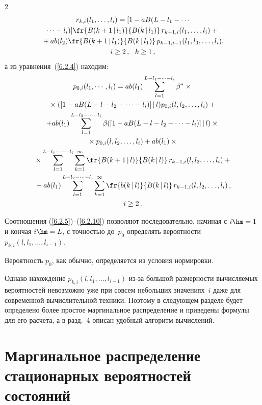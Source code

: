 \begin{multicols}{2}
\noindent
\begin{multline}
r_{k,i}(l_1,\ldots,l_i)
=[1 - a B(L-l_1-\cdots\\
\cdots -l_i)]
\fr{B(k+1\,|\,l_1)}{ B(k\,|\,l_1)}
\,r_{k-1,i}(l_1,\ldots,l_i)
 +{}
\\
{}+
a b(l_2)
\fr{B(k+1\,|\,l_1)}{ B(k\,|\,l_1)}
\,p_{k-1,i-1}(l_1,l_3,\ldots,l_i),
\\
 i \ge 2\,,\ \ k\ge 1\,,
\label{6.2.9}
\end{multline}
а из уравнения~(\ref{6.2.4}) находим:
\begin{multline}
p_{0,i}(l_1,\cdots,l_i)
=a b(l_1)
\sum\limits_{l=1}^{L-l_1-\cdots-l_i}
\beta^*\times{}\\
{}\times([1 - a B(L-l-l_2-\cdots-l_i)]\,|\,l)
p_{0,i}(l,l_2,\ldots,l_i)
 +{}
\\
+a b(l_1)
\sum\limits_{l=1}^{L-l_2-\cdots-l_i}
\beta([1 - a B(L-l-l_2-\cdots-l_i)]\,|\,l)\times{}\\
{}\times
p_{0,i}(l,l_2,\ldots,l_i)
 +a b(l_1)\times{}
\\
{}\times
\sum\limits_{l=1}^{L-l_1-\cdots-l_i}
\sum\limits_{k=1}^\infty
\fr{B(k+1\,|\,l)}{ B(k\,|\,l)}\,
r_{k-1,i}(l,l_2,\ldots,l_i)
 +{}\\
{}+ a b(l_1)
\sum\limits_{l=1}^{L-l_2-\cdots-l_i}
\sum\limits_{k=1}^\infty
\fr{b(k\,|\,l)}{B(k\,|\,l)}\,
r_{k-1,i}(l,l_2,\ldots,l_i)
\,,
\\
  i \ge 2\,.
\label{6.2.10}
\end{multline}

Соотношения (\ref{6.2.5})--(\ref{6.2.10}) позволяют
последовательно, начиная с $i\hm=1$ и кончая $i\hm=L$,
с точностью до~$p_0$
определять вероятности $p_{k,i}(l,l_1,\ldots,l_{i-1})$.

Вероятность $p_0$, как обычно, определяется из условия
нормировки.

Однако нахождение $p_{k,i}(l,l_1,\ldots,l_{i-1})$
из-за большой размерности вычисляемых вероятностей
невозможно уже при совсем небольших значениях~$i$ даже для современной вычислительной техники.
Поэтому в следующем разделе будет определено более простое маргинальное распределение и приведены
формулы для его расчета, а в разд.~4 описан удобный алгоритм вычислений.

\section{Маргинальное распределение стационарных
вероятностей состояний}


\end{multicols}
